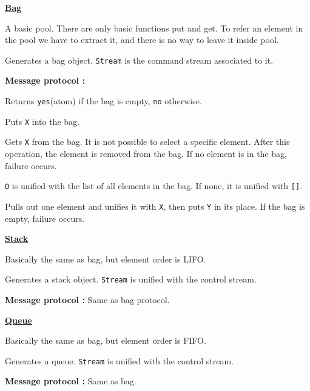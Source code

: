 \noindent\underline{\bf Bag}\vspace{1ex}\par
A basic pool. There are only basic functions put and get. To refer an element
 in
the pool we have to extract it, and there is no way to leave it inside pool.
\begin{itemize}

Generates a bag object. \verb|Stream| is the command stream associated to it.

\end{itemize}
{\bf Message protocol :}
\begin{itemize}

Returns \verb|yes|(atom) if the bag is empty, \verb|no| otherwise.

Puts \verb|X| into the bag.

Gets \verb|X| from the bag. It is not possible to select a specific element.
After this operation, the element is removed from the bag. If no element is
in the bag, failure occurs.

\verb|O| is unified with the list of all elements in the bag. If none,
it is unified with \verb|[]|.

Pulls out one element and unifies it with \verb|X|, then puts \verb|Y|
in its place. If the bag is empty, failure occurs.

\end{itemize}
\vspace{1ex}

\noindent\underline{\bf Stack}
\vspace{1ex}\par
Basically the same as bag, but element order is LIFO.
\begin{itemize}

Generates a stack object. \verb|Stream| is unified with the control stream.

\end{itemize}
{\bf Message protocol :} Same as bag protocol.
\vspace{1ex}

\noindent\underline{\bf Queue}\vspace{1ex}\par
Basically the same as bag, but element order is FIFO.
\begin{itemize}

Generates a queue. \verb|Stream| is unified with the control stream.

\end{itemize}
{\bf Message protocol :} Same as bag.
\vspace{1ex}

